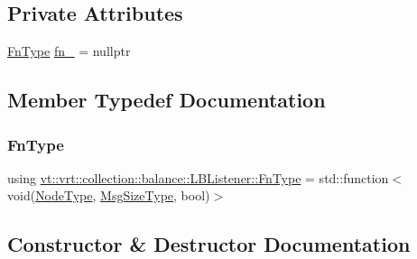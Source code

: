 \subsection*{Private Attributes}
\begin{DoxyCompactItemize}
\item 
\hyperlink{structvt_1_1vrt_1_1collection_1_1balance_1_1_l_b_listener_af3b881f723f2d7850f6941261449e4d9}{Fn\+Type} \hyperlink{structvt_1_1vrt_1_1collection_1_1balance_1_1_l_b_listener_a71e01f997215a3b8c5eb659a1921b6f7}{fn\+\_\+} = nullptr
\end{DoxyCompactItemize}


\subsection{Member Typedef Documentation}
\mbox{\label{structvt_1_1vrt_1_1collection_1_1balance_1_1_l_b_listener_af3b881f723f2d7850f6941261449e4d9}} 
\subsubsection{\texorpdfstring{Fn\+Type}{FnType}}
{\footnotesize\ttfamily using \hyperlink{structvt_1_1vrt_1_1collection_1_1balance_1_1_l_b_listener_af3b881f723f2d7850f6941261449e4d9}{vt\+::vrt\+::collection\+::balance\+::\+L\+B\+Listener\+::\+Fn\+Type} =  std\+::function$<$void(\hyperlink{namespacevt_a866da9d0efc19c0a1ce79e9e492f47e2}{Node\+Type}, \hyperlink{namespacevt_a408e86a8c7c89309b52907dc5a513924}{Msg\+Size\+Type}, bool)$>$}



\subsection{Constructor \& Destructor Documentation}
\mbox{\label{structvt_1_1vrt_1_1collection_1_1balance_1_1_l_b_listener_a61850d168d76a305261cf244d69b3237}} 
